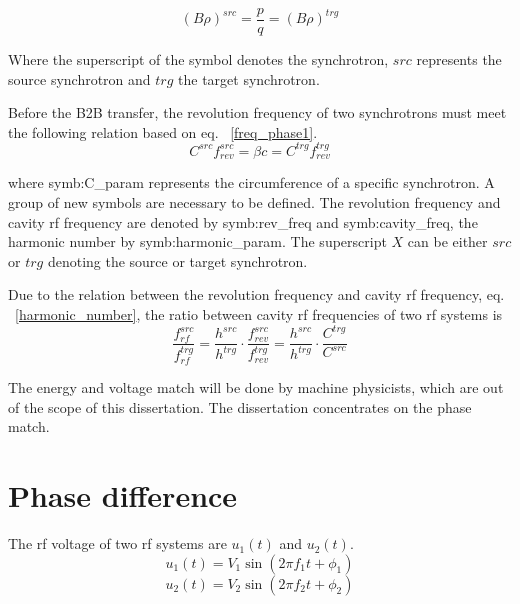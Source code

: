 \begin{equation}
	\label{eq:rigidity}
	(B\rho)^{\mathit{src}} =\frac{p}{q}=(B\rho)^{\mathit{trg}}
\end{equation}

Where the superscript of the symbol denotes the synchrotron, $\mathit{src}$ represents the source synchrotron and $\mathit{trg}$ the target synchrotron. 

Before the B2B transfer, the revolution frequency of two synchrotrons must meet the following relation based on eq. ~\ref{freq_phase1}. 
\begin{equation}
	C^{\mathit{src}}f_{rev}^{\mathit{src}} = \beta c=C^{\mathit{trg}}f_{rev}^{\mathit{trg}}
\end{equation}

where \gls{symb:C_param} represents the circumference of a specific synchrotron. A group of new symbols are necessary to be defined. The revolution frequency and cavity rf frequency are denoted by \gls{symb:rev_freq} and \gls{symb:cavity_freq}, the harmonic number by \gls{symb:harmonic_param}. The superscript $X$ can be either $src$ or $trg$ denoting the source or target synchrotron. 

Due to the relation between the revolution frequency and cavity rf frequency, eq. ~\ref{harmonic_number}, the ratio between cavity rf frequencies of two rf systems is
\begin{equation}
	\frac{f_{rf}^{\mathit{src}}}{f_{rf}^{\mathit{trg}}}=\frac{h^{\mathit{src}}}{h^{\mathit{trg}}}\cdot\frac{f_{rev}^{\mathit{src}}}{f_{rev}^{\mathit{trg}}}=\frac{h^{\mathit{src}}}{h^{\mathit{trg}}}\cdot \frac{C^{\mathit{trg}}}{C^{\mathit{src}}}
\end{equation}

The energy and voltage match will be done by machine physicists, which are out of the scope of this dissertation. The dissertation concentrates on the phase match.
\section{Phase difference}
\label{match}
The rf voltage of two rf systems are $u_1(t)$ and $u_2(t)$.
\begin{equation}
\label{rf_freq1}
	u_1(t)=V_1\sin(2\pi f_1t+\phi_1)
\end{equation}
\begin{equation}
\label{rf_freq2}
	u_2(t)=V_2\sin(2\pi f_2t+\phi_2)
\end{equation}


